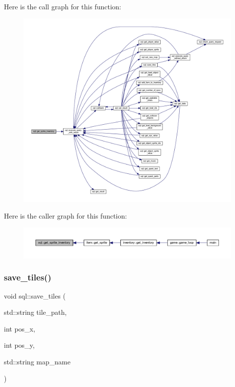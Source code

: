 Here is the call graph for this function\+:
\nopagebreak
\begin{figure}[H]
\begin{center}
\leavevmode
\includegraphics[width=350pt]{classsql_a060764a845c3a26c99c6f15470df9634_cgraph}
\end{center}
\end{figure}
Here is the caller graph for this function\+:
\nopagebreak
\begin{figure}[H]
\begin{center}
\leavevmode
\includegraphics[width=350pt]{classsql_a060764a845c3a26c99c6f15470df9634_icgraph}
\end{center}
\end{figure}
\mbox{\label{classsql_a4c6195e2934d72569b45041039a2be63}} 
\subsubsection{\texorpdfstring{save\+\_\+tiles()}{save\_tiles()}}
{\footnotesize\ttfamily void sql\+::save\+\_\+tiles (\begin{DoxyParamCaption}\item[{std\+::string}]{tile\+\_\+path,  }\item[{int}]{pos\+\_\+x,  }\item[{int}]{pos\+\_\+y,  }\item[{std\+::string}]{map\+\_\+name }\end{DoxyParamCaption})}



